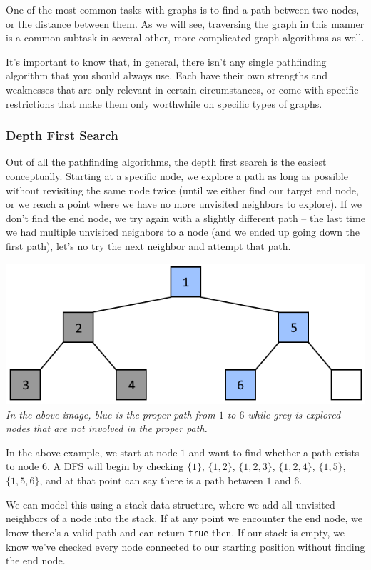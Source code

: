One of the most common tasks with graphs is to find a path between two nodes, or the distance between them. As we will see, traversing the graph in this manner is a common subtask in several other, more complicated graph algorithms as well.

It's important to know that, in general, there isn't any single pathfinding algorithm that you should always use. Each have their own strengths and weaknesses that are only relevant in certain circumstances, or come with specific restrictions that make them only worthwhile on specific types of graphs.

\subsubsection{Depth First Search}

Out of all the pathfinding algorithms, the depth first search is the easiest conceptually. Starting at a specific node, we explore a path as long as possible without revisiting the same node twice (until we either find our target end node, or we reach a point where we have no more unvisited neighbors to explore). If we don't find the end node, we try again with a slightly different path -- the last time we had multiple unvisited neighbors to a node (and we ended up going down the first path), let's no try the next neighbor and attempt that path.

{\centering \includegraphics[width=\textwidth]{images/graph/dfs.png}}
\textit{In the above image, blue is the proper path from $1$ to $6$ while grey is explored nodes that are not involved in the proper path.}

In the above example, we start at node $1$ and want to find whether a path exists to node $6$. A DFS will begin by checking $\{1\}$, $\{1, 2\}$, $\{1, 2, 3\}$, $\{1, 2, 4\}$, $\{1, 5\}$, $\{1, 5, 6\}$, and at that point can say there is a path between $1$ and $6$. 

We can model this using a stack data structure, where we add all unvisited neighbors of a node into the stack. If at any point we encounter the end node, we know there's a valid path and can return \texttt{true} then. If our stack is empty, we know we've checked every node connected to our starting position without finding the end node.

